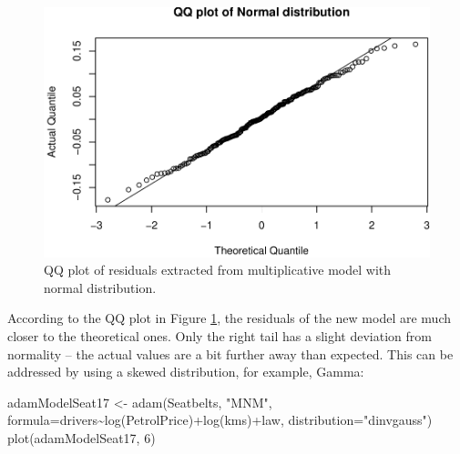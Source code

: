 \documentclass[
]{book}
\newenvironment{Shaded}{\begin{snugshade}}{\end{snugshade}}
\newcommand{\AttributeTok}[1]{\textcolor[rgb]{0.77,0.63,0.00}{#1}}
\newcommand{\DecValTok}[1]{\textcolor[rgb]{0.00,0.00,0.81}{#1}}
\newcommand{\FunctionTok}[1]{\textcolor[rgb]{0.00,0.00,0.00}{#1}}
\newcommand{\NormalTok}[1]{#1}
\newcommand{\OtherTok}[1]{\textcolor[rgb]{0.56,0.35,0.01}{#1}}
\newcommand{\SpecialCharTok}[1]{\textcolor[rgb]{0.00,0.00,0.00}{#1}}
\newcommand{\StringTok}[1]{\textcolor[rgb]{0.31,0.60,0.02}{#1}}
\theoremstyle{definition}
\theoremstyle{definition}
\theoremstyle{definition}
\theoremstyle{definition}
\theoremstyle{remark}
\begin{document}
\begin{figure}
\centering
\includegraphics{Svetunkov--2022----ADAM_files/figure-latex/adamModelSeat16QQ-1.pdf}
\caption{\label{fig:adamModelSeat16QQ}QQ plot of residuals extracted from multiplicative model with normal distribution.}
\end{figure}

According to the QQ plot in Figure \ref{fig:adamModelSeat16QQ}, the residuals of the new model are much closer to the theoretical ones. Only the right tail has a slight deviation from normality -- the actual values are a bit further away than expected. This can be addressed by using a skewed distribution, for example, Gamma:

\begin{Shaded}
\begin{Highlighting}[]
\NormalTok{adamModelSeat17 }\OtherTok{\textless{}{-}} \FunctionTok{adam}\NormalTok{(Seatbelts, }\StringTok{"MNM"}\NormalTok{,}
                        \AttributeTok{formula=}\NormalTok{drivers}\SpecialCharTok{\textasciitilde{}}\FunctionTok{log}\NormalTok{(PetrolPrice)}\SpecialCharTok{+}\FunctionTok{log}\NormalTok{(kms)}\SpecialCharTok{+}\NormalTok{law,}
                        \AttributeTok{distribution=}\StringTok{"dinvgauss"}\NormalTok{)}
\FunctionTok{plot}\NormalTok{(adamModelSeat17, }\DecValTok{6}\NormalTok{)}
\end{Highlighting}
\end{Shaded}
\end{document}

